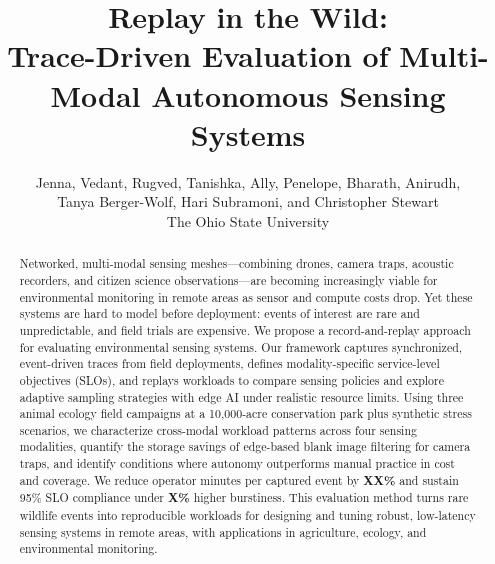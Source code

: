 \documentclass[letterpaper,twocolumn,10pt]{article}
\begin{document}
\date{}



\title{\Large \bf Replay in the Wild: \\ Trace-Driven Evaluation of Multi-Modal Autonomous Sensing Systems}



\author{
{\rm Jenna, Vedant, Rugved, Tanishka, Ally, Penelope, Bharath, Anirudh,} \\ \rm{Tanya Berger-Wolf, Hari Subramoni, and Christopher Stewart}\\
The Ohio State University
}

\maketitle

\thispagestyle{empty}

\begin{abstract}
Networked, multi\mbox{-}modal sensing meshes—combining drones, camera traps, acoustic recorders, and citizen science observations—are becoming increasingly viable for environmental monitoring in remote areas as sensor and compute costs drop. Yet these systems are hard to model before deployment: events of interest are rare and unpredictable, and field trials are expensive. We propose a record\mbox{-}and\mbox{-}replay approach for evaluating environmental sensing systems. Our framework captures synchronized, event\mbox{-}driven traces from field deployments, defines modality\mbox{-}specific service\mbox{-}level objectives (SLOs), and replays workloads
to compare sensing policies and explore adaptive sampling strategies with edge AI under realistic resource limits. Using three animal ecology field campaigns at a 10{,}000\mbox{-}acre conservation park plus synthetic stress scenarios, we characterize cross\mbox{-}modal workload patterns across four sensing modalities, quantify the storage savings of edge\mbox{-}based blank image filtering for camera traps, and identify conditions where autonomy outperforms manual practice in cost and coverage. We reduce operator minutes per captured event by \textbf{XX\%} and sustain 95\% SLO compliance under \textbf{X\%} higher burstiness. This evaluation method turns rare wildlife events into reproducible workloads for designing and tuning robust, low\mbox{-}latency sensing systems in remote areas, with applications in agriculture, ecology, and environmental monitoring.
\end{abstract}
\end{document}
